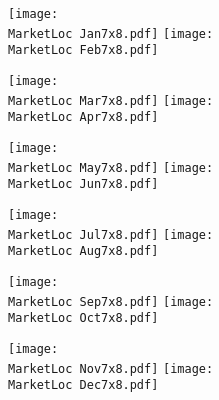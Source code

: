 \documentclass[letterpaper,12pt]{article}
\newcommand{\MarketLoc}{PWXCT}
\begin{document}
\begin{figure}
\vspace*{-2\baselineskip}
\centerline{ 
  \texttt{[image: \\MarketLoc Jan7x8.pdf]}
  \texttt{[image: \\MarketLoc Feb7x8.pdf]}}
\vspace*{-\baselineskip}
\centerline{ 
  \texttt{[image: \\MarketLoc Mar7x8.pdf]}
  \texttt{[image: \\MarketLoc Apr7x8.pdf]}}
\vspace*{-\baselineskip}
\centerline{ 
  \texttt{[image: \\MarketLoc May7x8.pdf]}
  \texttt{[image: \\MarketLoc Jun7x8.pdf]}}
\end{figure}

\begin{figure}
\vspace*{-2\baselineskip}
\centerline{ 
  \texttt{[image: \\MarketLoc Jul7x8.pdf]}
  \texttt{[image: \\MarketLoc Aug7x8.pdf]}}
\vspace*{-\baselineskip}
\centerline{ 
  \texttt{[image: \\MarketLoc Sep7x8.pdf]}
  \texttt{[image: \\MarketLoc Oct7x8.pdf]}}
\vspace*{-\baselineskip}
\centerline{ 
  \texttt{[image: \\MarketLoc Nov7x8.pdf]}
  \texttt{[image: \\MarketLoc Dec7x8.pdf]}}
\end{figure}


\clearpage                                                            
\end{document}
